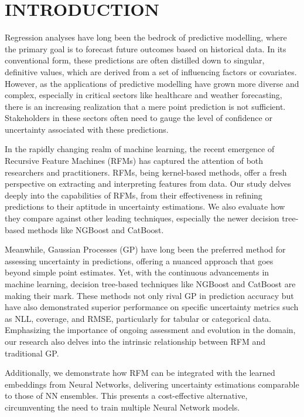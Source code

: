 \section{INTRODUCTION}

Regression analyses have long been the bedrock of predictive modelling, where the primary goal is to forecast future outcomes based on historical data. In its conventional form, these predictions are often distilled down to singular, definitive values, which are derived from a set of influencing factors or covariates. However, as the applications of predictive modelling have grown more diverse and complex, especially in critical sectors like healthcare and weather forecasting, there is an increasing realization that a mere point prediction is not sufficient. Stakeholders in these sectors often need to gauge the level of confidence or uncertainty associated with these predictions.

In the rapidly changing realm of machine learning, the recent emergence of Recursive Feature Machines (RFMs) has captured the attention of both researchers and practitioners. RFMs, being kernel-based methods, offer a fresh perspective on extracting and interpreting features from data. Our study delves deeply into the capabilities of RFMs, from their effectiveness in refining predictions to their aptitude in uncertainty estimations. We also evaluate how they compare against other leading techniques, especially the newer decision tree-based methods like NGBoost and CatBoost. 


Meanwhile, Gaussian Processes (GP) have long been the preferred method for assessing uncertainty in predictions, offering a nuanced approach that goes beyond simple point estimates. Yet, with the continuous advancements in machine learning, decision tree-based techniques like NGBoost and CatBoost are making their mark. These methods not only rival GP in prediction accuracy but have also demonstrated superior performance on specific uncertainty metrics such as NLL, coverage, and RMSE, particularly for tabular or categorical data. Emphasizing the importance of ongoing assessment and evolution in the domain, our research also delves into the intrinsic relationship between RFM and traditional GP.

Additionally, we demonstrate how RFM can be integrated with the learned embeddings from Neural Networks, delivering uncertainty estimations comparable to those of NN ensembles. This presents a cost-effective alternative, circumventing the need to train multiple Neural Network models.


